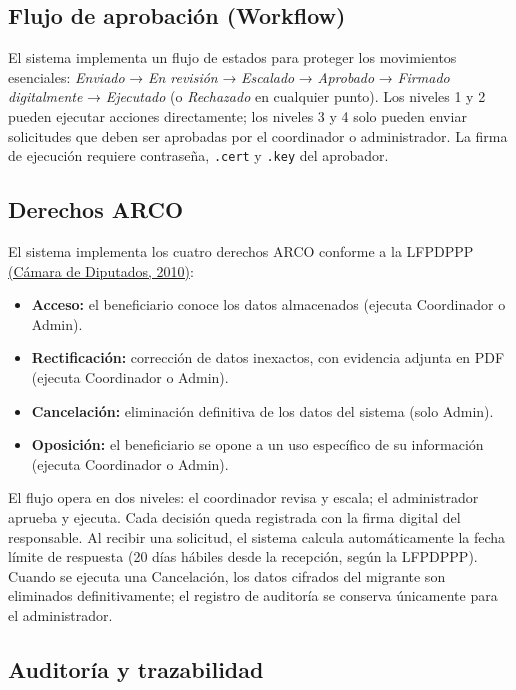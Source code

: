 \documentclass[10pt,letterpaper]{report}
\newcommand{\citeref}[2]{\hyperlink{ref:#1}{(#2)}}
\begin{document}
\subsection{Flujo de aprobación (Workflow)}

El sistema implementa un flujo de estados para proteger los movimientos esenciales: \textit{Enviado} → \textit{En revisión} → \textit{Escalado} → \textit{Aprobado} → \textit{Firmado digitalmente} → \textit{Ejecutado} (o \textit{Rechazado} en cualquier punto). Los niveles 1 y 2 pueden ejecutar acciones directamente; los niveles 3 y 4 solo pueden enviar solicitudes que deben ser aprobadas por el coordinador o administrador. La firma de ejecución requiere contraseña, \texttt{.cert} y \texttt{.key} del aprobador.

\subsection{Derechos ARCO}

El sistema implementa los cuatro derechos ARCO conforme a la LFPDPPP \citeref{camara2010}{Cámara de Diputados, 2010}:

\begin{itemize}
    \item \textbf{Acceso:} el beneficiario conoce los datos almacenados (ejecuta Coordinador o Admin).
    \item \textbf{Rectificación:} corrección de datos inexactos, con evidencia adjunta en PDF (ejecuta Coordinador o Admin).
    \item \textbf{Cancelación:} eliminación definitiva de los datos del sistema (solo Admin).
    \item \textbf{Oposición:} el beneficiario se opone a un uso específico de su información (ejecuta Coordinador o Admin).
\end{itemize}

El flujo opera en dos niveles: el coordinador revisa y escala; el administrador aprueba y ejecuta. Cada decisión queda registrada con la firma digital del responsable. Al recibir una solicitud, el sistema calcula automáticamente la fecha límite de respuesta (20 días hábiles desde la recepción, según la LFPDPPP). Cuando se ejecuta una Cancelación, los datos cifrados del migrante son eliminados definitivamente; el registro de auditoría se conserva únicamente para el administrador.

\subsection{Auditoría y trazabilidad}
\end{document}
